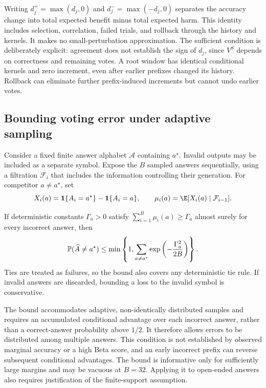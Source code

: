 Writing $d_j^+=\max(d_j,0)$ and $d_j^-=\max(-d_j,0)$ separates the accuracy change into total expected benefit minus total expected harm. This identity includes selection, correlation, failed trials, and rollback through the history and kernels. It makes no small-perturbation approximation. The sufficient condition is deliberately explicit: agreement does not establish the sign of $d_j$, since $V^S$ depends on correctness and remaining votes. A root window has identical conditional kernels and zero increment, even after earlier prefixes changed its history. Rollback can eliminate further prefix-induced increments but cannot undo earlier votes.

\subsection{Bounding voting error under adaptive sampling}
Consider a fixed finite answer alphabet $\mathcal A$ containing $a^\star$. Invalid outputs may be included as a separate symbol. Expose the $B$ sampled answers sequentially, using a filtration $\mathcal F_i$ that includes the information controlling their generation. For competitor $a\neq a^\star$, set
\[
 X_i(a)=\ind\{A_i=a^\star\}-\ind\{A_i=a\},\qquad
 \mu_i(a)=\E[X_i(a)\mid\mathcal F_{i-1}].
\]
\begin{theorem}
\label{thm:plurality}
If deterministic constants $\Gamma_a>0$ satisfy
$\sum_{i=1}^B\mu_i(a)\geq\Gamma_a$ almost surely for every incorrect answer, then
\begin{equation}
 \mathbb{P}(\widehat A\neq a^\star)
 \leq \min\left\{1,\sum_{a\neq a^\star}
                  \exp\left(-\frac{\Gamma_a^2}{2B}\right)\right\}.
 \label{eq:margin}
\end{equation}
Ties are treated as failures, so the bound also covers any deterministic tie rule. If invalid answers are discarded, bounding a loss to the invalid symbol is conservative.
\end{theorem}

The bound accommodates adaptive, non-identically distributed samples and requires an accumulated conditional advantage over each incorrect answer, rather than a correct-answer probability above $1/2$. It therefore allows errors to be distributed among multiple answers. This condition is not established by observed marginal accuracy or a high Beta score, and an early incorrect prefix can reverse subsequent conditional advantages. The bound is informative only for sufficiently large margins and may be vacuous at $B=32$. Applying it to open-ended answers also requires justification of the finite-support assumption.

